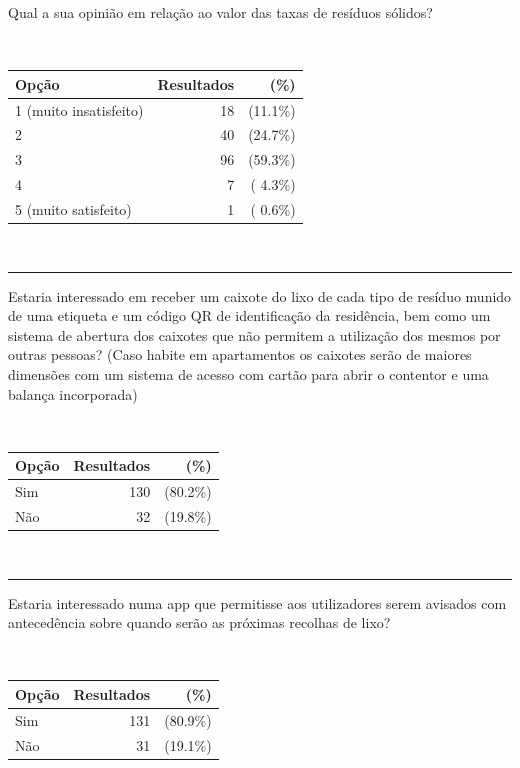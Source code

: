 \documentclass[11pt, a4paper, oneside]{book}
\begin{document}
\begin{appendices}
\begin{mdframed}[innerleftmargin=7.5mm, innerrightmargin=7.5mm, innertopmargin=7.5mm, innerbottommargin=7.5mm]
Qual a sua opinião em relação ao valor das taxas de resíduos sólidos?

~

\begin{tabular}{@{} l | r r @{} }
    \textbf{Opção} & \textbf{Resultados} & \textbf{(\%)} \\ \hline
    1 (muito insatisfeito) &  18 & (11.1\%) \\
    2                      &  40 & (24.7\%) \\
    3                      &  96 & (59.3\%) \\
    4                      &   7 & ( 4.3\%) \\
    5 (muito satisfeito)   &   1 & ( 0.6\%)
\end{tabular}

~

\rule{\linewidth}{0.5pt}\vspace{0.5em}

Estaria interessado em receber um caixote do lixo de cada tipo de resíduo munido de uma etiqueta e um código QR de identificação da residência, bem como um sistema de abertura dos caixotes que não permitem a utilização dos mesmos por outras pessoas? (Caso habite em apartamentos os caixotes serão de maiores dimensões com um sistema de acesso com cartão para abrir o contentor e uma balança incorporada)

~

\begin{tabular}{@{} l | r r @{} }
    \textbf{Opção} & \textbf{Resultados} & \textbf{(\%)} \\ \hline
    Sim & 130 & (80.2\%) \\
    Não &  32 & (19.8\%) \\
\end{tabular}

~

\rule{\linewidth}{0.5pt}\vspace{0.5em}

Estaria interessado numa app que permitisse aos utilizadores serem avisados com antecedência sobre quando serão as próximas recolhas de lixo?

~

\begin{tabular}{@{} l | r r @{} }
    \textbf{Opção} & \textbf{Resultados} & \textbf{(\%)} \\ \hline
    Sim & 131 & (80.9\%) \\
    Não &  31 & (19.1\%) \\
\end{tabular}


\end{mdframed}
\end{appendices}
\end{document}
